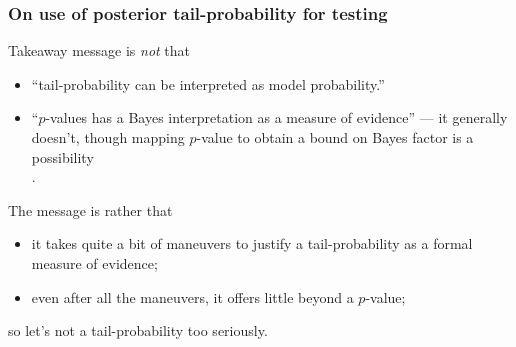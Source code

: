 \documentclass[18pt]{beamer}
\newenvironment{indented}[1][3]{%
	\hfill \begin{minipage}{\dimexpr\textwidth-#1ex} 
	}{
	\end{minipage}
}
\newenvironment{tightItemize}[1][]{%
  \vspace{-.3\baselineskip}%
  \begin{itemize}[#1]
  \addtolength\itemsep{-.1\baselineskip}
}{
  \end{itemize}
}
\begin{document}
\begin{frame}
\frametitle{On use of posterior tail-probability for testing}

Takeaway message is \textit{not} that 
\pause
\begin{tightItemize}
\item ``tail-probability can be interpreted as model probability.''
\pause
\item ``$p$-values has a Bayes interpretation as a measure of evidence'' --- it generally doesn't, though mapping $p$-value to obtain a bound on Bayes factor is a possibility\\
\hfill \citep{benjamin2019use_of_pvalue}.
\end{tightItemize}

\pause
The message is rather that 
\pause
\begin{tightItemize}
\item it takes quite a bit of maneuvers to justify a tail-probability as a formal measure of evidence;
\pause
\item even after all the maneuvers, it offers little beyond a $p$-value;
\end{tightItemize}
\pause
\vspace*{-.2\baselineskip}
so let's not a tail-probability too seriously.

%
\end{frame}
\end{document}
